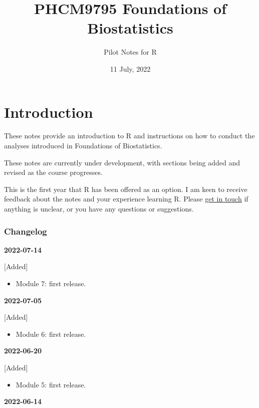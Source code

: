 \documentclass[
]{memoir}
\title{PHCM9795 Foundations of Biostatistics}
\author{Pilot Notes for R}
\date{11 July, 2022}
\providecommand{\tightlist}{%
  \setlength{\itemsep}{0pt}\setlength{\parskip}{0pt}}
\begin{document}
\maketitle

{
\setcounter{tocdepth}{1}
\tableofcontents
}
\hypertarget{introduction}{%
\chapter*{Introduction}\label{introduction}}

These notes provide an introduction to R and instructions on how to conduct the analyses introduced in Foundations of Biostatistics.

These notes are currently under development, with sections being added and revised as the course progresses.

This is the first year that R has been offered as an option. I am keen to receive feedback about the notes and your experience learning R. Please \href{mailto:t.dobbins@unsw.edu.au}{get in touch} if anything is unclear, or you have any questions or suggestions.

\hypertarget{changelog}{%
\subsection*{Changelog}\label{changelog}}

\textbf{2022-07-14}

{[}Added{]}

\begin{itemize}
\tightlist
\item
  Module 7: first release.
\end{itemize}

\textbf{2022-07-05}

{[}Added{]}

\begin{itemize}
\tightlist
\item
  Module 6: first release.
\end{itemize}

\textbf{2022-06-20}

{[}Added{]}

\begin{itemize}
\tightlist
\item
  Module 5: first release.
\end{itemize}

\textbf{2022-06-14}
\end{document}
